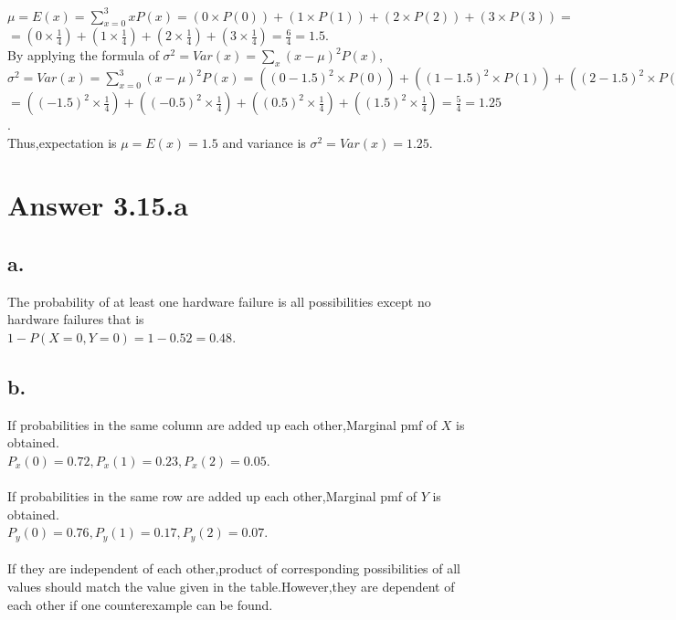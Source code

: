 \documentclass[12pt]{article}
\begin{document}
$\mu=E(x)=\sum\limits_{x=0}^3 xP(x)=(0\times P(0))+(1\times P(1))+(2\times P(2))+(3\times P(3))=$\\
$=(0\times \frac{1}{4})+(1\times \frac{1}{4})+(2\times \frac{1}{4})+(3\times \frac{1}{4})=\frac{6}{4}=1.5$.\\

By applying the formula of $\sigma^2=Var(x)=\sum\limits_{x} (x-\mu)^2P(x)$,\\ 

$\sigma^2=Var(x)=\sum\limits_{x=0}^3 (x-\mu)^2P(x)=((0-1.5)^2\times P(0))+((1-1.5)^2\times P(1))+((2-1.5)^2\times P(2))+((3-1.5)^2\times P(3))=$\\
$=((-1.5)^2\times \frac{1}{4})+((-0.5)^2\times \frac{1}{4})+((0.5)^2\times \frac{1}{4})+((1.5)^2\times \frac{1}{4})=\frac{5}{4}=1.25$.\\

Thus,expectation is $\mu=E(x)=1.5$ and variance is $\sigma^2=Var(x)=1.25$.

\section*{Answer 3.15.a}
\subsection*{a.}

The probability of at least one hardware failure is all possibilities except no hardware failures that is\\

$1 - P(X = 0,Y = 0) = 1 - 0.52 = 0.48$.

\subsection*{b.}

If probabilities in the same column are added up each other,Marginal pmf of $X$ is obtained.\\

$P_x(0)=0.72,P_x(1)=0.23,P_x(2)=0.05$.\\\\
If probabilities in the same row are added up each other,Marginal pmf of $Y$ is obtained.\\

$P_y(0)=0.76,P_y(1)=0.17,P_y(2)=0.07$. \\\\
If they are independent of each other,product of corresponding possibilities of all values should match the value given in the table.However,they are dependent of each other if one counterexample can be found.\\
\end{document}
